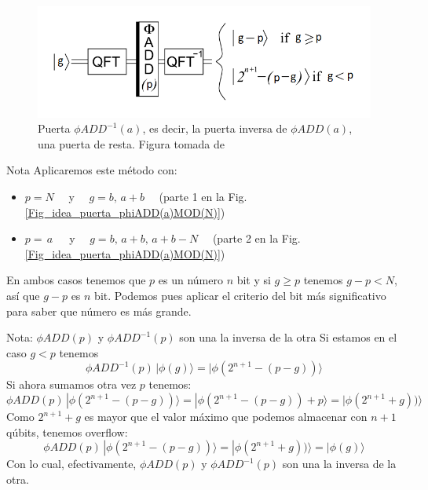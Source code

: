 \documentclass[a4paper,11pt]{book} %
\numberwithin{equation}{chapter}
\begin{document}
\begin{figure}[t]
\centering 
\includegraphics[width=0.6\linewidth]{Figuras/Fig-phiADD(a)^-1.png}
\caption{Puerta $\phi ADD^{-1}(a)$, es decir, la puerta inversa de $\phi ADD(a)$, una puerta de resta. Figura tomada de \cite{bib_2n+3}}
\label{Fig_idea_resta}
\end{figure}

\begin{mybox_blue}{Nota}
Aplicaremos este método con:

\begin{itemize}
	\item $p = N \quad$ y $\quad g = b, \, a+b \quad$ (parte 1 en la Fig. \ref{Fig_idea_puerta_phiADD(a)MOD(N)})
	
	\item $p = \, a \, \quad$ y $\quad g = b, \, a+b, \, a+b - N \quad$   (parte 2 en la Fig. \ref{Fig_idea_puerta_phiADD(a)MOD(N)})
\end{itemize}
   
    
En ambos casos tenemos que $p$ es un número $n$ bit y si $g \geq p$ tenemos $g-p < N$, así que $g-p$ es $n$ bit. Podemos pues aplicar el criterio del bit más significativo para saber que número es más grande. 
\end{mybox_blue}

\begin{mybox_blue}{Nota: $\phi ADD(p)$ y $\phi ADD^{-1}(p)$ son una la inversa de la otra}
Si estamos en el caso $g<p$ tenemos 
	\begin{equation}
	\phi ADD^{-1}(p) \, | \phi(g) \rangle = |\phi (2^{n+1} - (p-g)) \rangle
	\end{equation}
Si ahora sumamos otra vez $p$ tenemos:
	\begin{equation}
	\phi ADD(p) \, |\phi (2^{n+1} - (p-g)) \rangle =  |\phi (2^{n+1} - (p-g)) + p \rangle =  |\phi (2^{n+1} + g)) \rangle
	\end{equation}
Como $2^{n+1} + g$ es mayor que el valor máximo que podemos almacenar con $n+1$ qúbits, tenemos overflow:
	\begin{equation}
	\phi ADD(p) \, |\phi (2^{n+1} - (p-g)) \rangle = |\phi (2^{n+1} + g)) \rangle = |\phi (g) \rangle
	\end{equation}
	Con lo cual, efectivamente, $\phi ADD(p)$ y $\phi ADD^{-1}(p)$ son una la inversa de la otra.
\end{mybox_blue}
\end{document}
